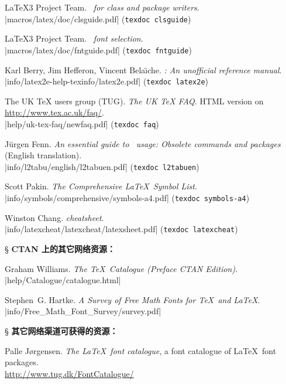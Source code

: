 \begin{thebibliography}{20}
 \LaTeX3 Project Team.
  \newblock \emph{\LaTeXe\ for class and package writers}. \\
  \CTAN|macros/latex/doc/clsguide.pdf| (\texttt{texdoc clsguide})

 \LaTeX3 Project Team.
  \newblock \emph{\LaTeXe\ font selection}. \\
  \CTAN|macros/latex/doc/fntguide.pdf| (\texttt{texdoc fntguide})

 Karl Berry, Jim Hefferon, Vincent Bela\"{\i}che.
  \newblock \emph{\LaTeXe: An unofficial reference manual}. \\
  \CTAN|info/latex2e-help-texinfo/latex2e.pdf| (\texttt{texdoc latex2e})

 The UK TeX users group (TUG).
  \newblock \emph{The UK TeX FAQ}. 
  \newblock HTML version on \url{http://www.tex.ac.uk/faq/}. \\
  \CTAN|help/uk-tex-faq/newfaq.pdf| (\texttt{texdoc faq})

 J\"{u}rgen Fenn.
  \newblock \emph{An essential guide to \LaTeXe\ usage: Obsolete commands and packages} (English translation). \\
  \CTAN|info/l2tabu/english/l2tabuen.pdf| (\texttt{texdoc l2tabuen})

 Scott Pakin.
  \newblock \emph{The Comprehensive \LaTeX\ Symbol List}. \\
  \CTAN|info/symbols/comprehensive/symbols-a4.pdf| (\texttt{texdoc symbols-a4})

 Winston Chang.
  \newblock \emph{\LaTeXe cheatsheet}. \\
  \CTAN|info/latexcheat/latexcheat/latexsheet.pdf| (\texttt{texdoc latexcheat})

\item[\S] {\bfseries CTAN 上的其它网络资源：}

 Graham Williams.
  \newblock \emph{The \TeX\ Catalogue (Preface CTAN Edition)}.\\
  \CTAN|help/Catalogue/catalogue.html|

 Stephen~G. Hartke.
  \newblock \emph{A Survey of Free Math Fonts for \TeX\ and \LaTeX}.\\
  \CTAN|info/Free_Math_Font_Survey/survey.pdf|

\item[\S] {\bfseries 其它网络渠道可获得的资源：}

 Palle J{\o}rgensen.
  \newblock \emph{The \LaTeX\ font catalogue}, a font catalogue of \LaTeX\ font packages.\\
  \url{http://www.tug.dk/FontCatalogue/}


\end{thebibliography}
